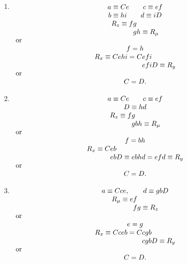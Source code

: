 \begin{enumerate}
\item $\begin{array}[t]{c}
a \equiv Ce \qquad c \equiv ef\\
b \equiv hi \qquad d \equiv iD\\
\begin{array}{r@{}c@{}l}
R_z \equiv f&g&\\
      &g&h \equiv R_\mu
\end{array}\\
\makebox[\textwidth][l]{or}\\
f = h\\
\begin{array}{r@{}c@{}l}
R_x \equiv Cehi = C&efi&\\
      &efi&D \equiv R_y
\end{array}\\
\makebox[\textwidth][l]{or}\\
C = D.
\end{array}$

\bigskip

\item $\begin{array}[t]{c}
a \equiv Ce \qquad c \equiv ef\\
D \equiv hd\\
\begin{array}{r@{}c@{}l}
R_z \equiv f&g&\\
      &g&bh \equiv R_\mu
\end{array}\\
\makebox[\textwidth][l]{or}\\
f = bh\\
\begin{array}{r@{}c@{}l}
R_x \equiv C&eb&\\
      &eb&D \equiv ebhd = efd \equiv R_y
\end{array}\\
\makebox[\textwidth][l]{or}\\
C = D.
\end{array}$

\item $\begin{array}[t]{c}
a \equiv Cce, \qquad d \equiv gbD\\
\begin{array}{r@{}c@{}l}
R_\mu \equiv e&f&\\
      &f&g \equiv R_z
\end{array}\\
\makebox[\textwidth][l]{or}\\
e = g\\
\begin{array}{r@{}c@{}l}
R_x \equiv Cceb = C&cgb&\\
      &cgb&D \equiv  R_y
\end{array}\\
\makebox[\textwidth][l]{or}\\
C = D.
\end{array}$


\end{enumerate}
